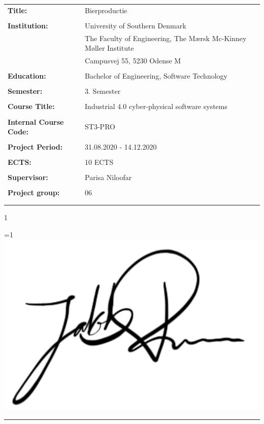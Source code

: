 \begin{tabular}{@{}l l} 
\textbf{Title:} & Bierproductie \\
& \\
\textbf{Institution:} & University of Southern Denmark \\
& The Faculty of Engineering, The Mærsk Mc-Kinney Møller Institute \\
& Campusvej 55, 5230 Odense M \\
& \\
\textbf{Education:} & Bachelor of Engineering, Software Technology\\
& \\
\textbf{Semester:} & 3. Semester \\
& \\
\textbf{Course Title:} & Industrial 4.0 cyber-physical software systems \\
& \\
\textbf{Internal Course Code:} & ST3-PRO \\
& \\
\textbf{Project Period:} &  31.08.2020 - 14.12.2020\\
& \\
\textbf{ECTS:} & 10 ECTS\\
& \\
\textbf{Supervisor:} & Parisa Niloofar\\
& \\
\textbf{Project group:} & 06\\
& \\

\\
\end{tabular}

\setcounter{PROD} {1}



\ifnum \value{PROD}=1
    \includegraphics[scale=0.07]{images/signatures/signatureJR.jpg}
    \vspace{-9.5mm}
\fi
\par\rule{\textwidth}{0.4pt}

